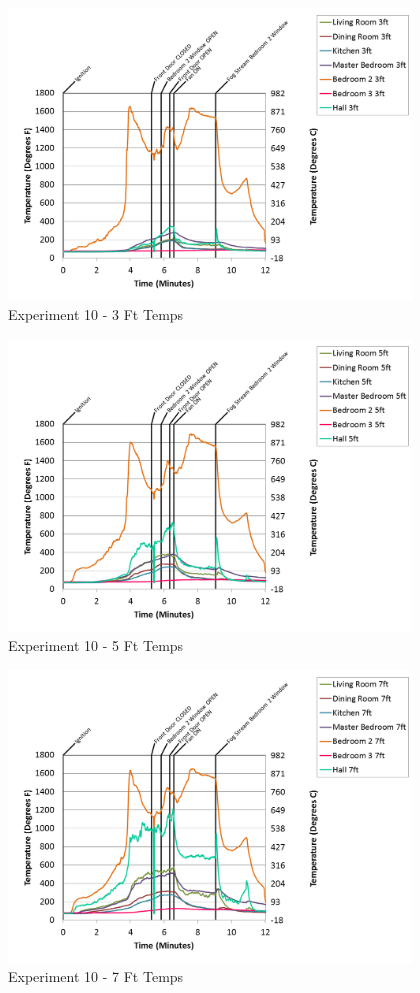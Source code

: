 \documentclass{article}
\begin{document}
\begin{appendices}
\begin{figure}[h!]
	\centering
	\includegraphics[height=3.05in]{0_Images/Results_Charts/Exp_10_Charts/3FtTemps.png}
	\caption{Experiment 10 - 3 Ft Temps}
\end{figure}

\clearpage

\begin{figure}[h!]
	\centering
	\includegraphics[height=3.05in]{0_Images/Results_Charts/Exp_10_Charts/5FtTemps.png}
	\caption{Experiment 10 - 5 Ft Temps}
\end{figure}


\begin{figure}[h!]
	\centering
	\includegraphics[height=3.05in]{0_Images/Results_Charts/Exp_10_Charts/7FtTemps.png}
	\caption{Experiment 10 - 7 Ft Temps}
\end{figure}


\end{appendices}
\end{document}
